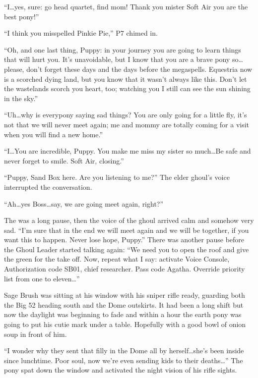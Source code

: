 ``I\dots yes, sure: go head quartet, find mom! Thank you mister Soft Air you are the best pony!''

``I think you misspelled Pinkie Pie,'' P7 chimed in.

``Oh, and one last thing, Puppy: in your journey you are going to learn things that will hurt you. It's unavoidable, but I know that you are a brave pony so\dots please, don't forget these days and the days before the megaspells. Equestria now is a scorched dying land, but you know that it wasn't always like this. Don't let the wastelands scorch you heart, too; watching you I still can see the sun shining in the sky.''

``Uh\dots why is everypony saying sad things? You are only going for a little fly, it's not that we will never meet again; me and mommy are totally coming for a visit when you will find a new home.''

``I\dots You are incredible, Puppy. You make me miss my sister so much\dots Be safe and never forget to smile. Soft Air, closing.''

``Puppy, Sand Box here. Are you listening to me?'' The elder ghoul's voice interrupted the conversation.

``Ah\dots yes Boss\dots say, we are going meet again, right?''

The was a long pause, then the voice of the ghoul arrived calm and somehow very sad. ``I'm sure that in the end we will meet again and we will be together, if you want this to happen. Never lose hope, Puppy.'' There was another pause before the Ghoul Leader started talking again: ``We need you to open the roof and give the green for the take off. Now, repeat what I say: activate Voice Console, Authorization code SB01, chief researcher. Pass code Agatha. Override priority list from one to eleven\dots''

\horizonline


Sage Brush was sitting at his window with his sniper rifle ready, guarding both the Big 52 heading south and the Dome outskirts. It had been a long shift but now the daylight was beginning to fade and within a hour the earth pony was going to put his cutie mark under a table. Hopefully with a good bowl of onion soup in front of him.

``I wonder why they sent that filly in the Dome all by herself\dots she's been inside since lunchtime. Poor soul, now we're even sending kids to their deaths\dots'' The pony spat down the window and activated the night vision of his rifle sights.


